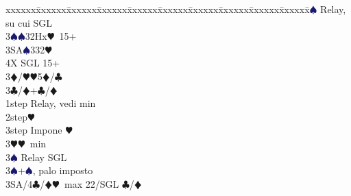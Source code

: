 \documentclass[a4paper,italian]{article}
\newcommand{\BC}{\textcolor{OliveGreen}{$\clubsuit$}}
\newcommand{\BD}{\textcolor{RedOrange}{$\vardiamondsuit$}}
\newcommand{\BH}{\textcolor{Red2}{$\varheartsuit${}}}
\newcommand{\BS}{\textcolor{MidnightBlue}{$\spadesuit${}}}
\newenvironment{bidtable}
{\begin{tabbing}

    xxxxxx\=xxxxxx\=xxxxxx\=xxxxxx\=xxxxxx\=xxxxxx\=xxxxxx\=xxxxxx\=xxxxxx\=xxxxxx\=\kill}
{\end{tabbing} }%
\begin{document}
\begin{multicols}{2}
\begin{bidtable}
                                            3\BS\> Relay, su cui SGL\-\\
                                            3\BS{}\BS32Hx\BH\ 15+\\
                                            3SA\BS332\BH\\
                                            4X\> SGL 15+\-\\
                                            3\BD/\BH{}\BH5\BD/\BC\-\\
                                            3\BC/\BD{}+\BC/\BD\+\\
                                            1step\> Relay, vedi min\\
                                            2step\BH\\
                                            3step\> Impone \BH\-\\
                                            3\BH{}\BH\ min\+\\
                                            3\BS\> Relay SGL\-\\
                                            3\BS{}+\BS, palo imposto\\
                                            3SA/4\BC/\BD\>\BH\ max 22/SGL \BC/\BD
                                        \end{bidtable}

\end{multicols}
\end{document}

